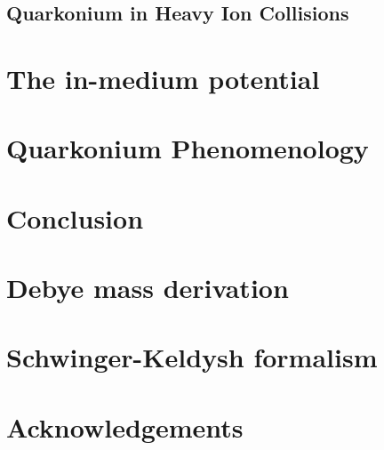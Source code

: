 \documentclass[12pt, a4paper, twoside]{book}
\begin{document}
\section{Quarkonium in Heavy Ion Collisions}
\label{sec:quark_HIC}
\onehalfspacing
\chapter{The in-medium potential}
\label{sec:med_pot}
\onehalfspacing
\chapter{Quarkonium Phenomenology}
\label{sec:quark_pheno}
\onehalfspacing
\chapter{Conclusion}
\label{sec:conc}
\onehalfspacing

\begin{appendices}
\chapter{Debye mass derivation}
\chapter{Schwinger-Keldysh formalism}
\end{appendices}



\chapter*{Acknowledgements}


\cleardoublepage

\end{document}
